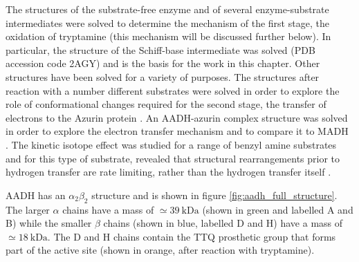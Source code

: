 The structures of the substrate-free enzyme and of several enzyme-substrate intermediates were solved to determine the mechanism of the first stage, the oxidation of tryptamine \cite{masgrauAtomicDescriptionEnzyme2006} (this mechanism will be discussed further below). In particular, the structure of the Schiff-base intermediate was solved (PDB accession code 2AGY) and is the basis for the work in this chapter. Other structures have been solved for a variety of purposes. The structures after reaction with a number different substrates were solved in order to explore the role of conformational changes required for the second stage, the transfer of electrons to the Azurin protein \cite{roujeinikovaNewInsightsReductive2007}.  An AADH-azurin complex structure was solved in order to explore the electron transfer mechanism and to compare it to MADH \cite{sukumarCrystalStructureElectron2006}. The kinetic isotope effect was studied for a range of benzyl amine substrates and for this  type of substrate, revealed that structural rearrangements prior to hydrogen transfer are rate limiting, rather than the hydrogen transfer itself \cite{hothiIsotopeEffectsReveal2007}.  

AADH has an $\alpha_{2}\beta_{2}$ structure and is shown in figure \ref{fig:aadh_full_structure}. The larger $\alpha$ chains have a mass of $\simeq \SI{39}{\kilo\dalton}$ (shown in green and labelled A and B) while the smaller $\beta$ chains (shown in blue, labelled D and H) have a mass of $\simeq \SI{18}{\kilo\dalton}$. The D and H chains contain the TTQ prosthetic group that forms part of the active site (shown in orange, after reaction with tryptamine). 

